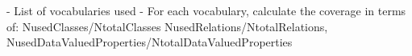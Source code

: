 
- List of vocabularies used
- For each vocabulary, calculate the coverage in terms of:
NusedClasses/NtotalClasses
NusedRelations/NtotalRelations, NusedDataValuedProperties/NtotalDataValuedProperties
